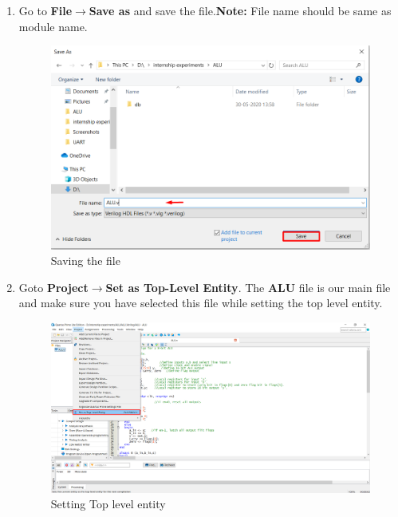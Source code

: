 \documentclass[12pt,singleside,a4paper]{article}
\begin{document}
\begin{enumerate}
    \item Go to \textbf{File}$\rightarrow$\textbf{Save as} and save the file.\newline\textbf{Note:} File name should be same as module name.
    \begin{figure}[H]
        \centering
    \includegraphics[width=14cm,keepaspectratio]{save4.png}
    \caption{Saving the file}
    \end{figure}
    \newpage
    \item Goto \textbf{Project}$\rightarrow$\textbf{Set as Top-Level Entity}. The \textbf{ALU} file is our main file and make sure you have selected this file while setting the top level entity.
    \begin{figure}[H]
        \centering
    \includegraphics[width=14cm,keepaspectratio]{alusetnew2.png}
    \caption{Setting Top level entity}
    \end{figure}
    

\end{enumerate}
\end{document}
